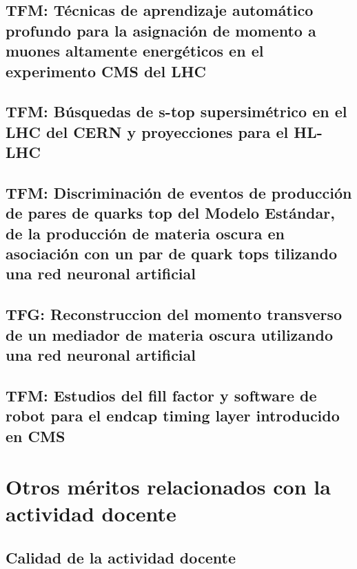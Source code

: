 \documentclass[a4paper, 11pt, twoside, openright]{report}
\begin{document}
\subsection{TFM: Técnicas de aprendizaje automático profundo para la asignación de momento a muones altamente energéticos en el experimento CMS del LHC}


\subsection{TFM: Búsquedas de s-top supersimétrico en el LHC del CERN y proyecciones para el HL-LHC}


\subsection{TFM: Discriminación de eventos de producción de pares de quarks top del Modelo Estándar, de la producción de materia oscura en asociación con un par de quark tops tilizando una red neuronal artificial}


\subsection{TFG: Reconstruccion del momento transverso de un mediador de materia oscura utilizando una red neuronal artificial}


\subsection{TFM: Estudios del fill factor y software de robot para el endcap timing layer introducido en CMS}




\section{Otros méritos relacionados con la actividad docente}

\subsection{Calidad de la actividad docente}
\end{document}
